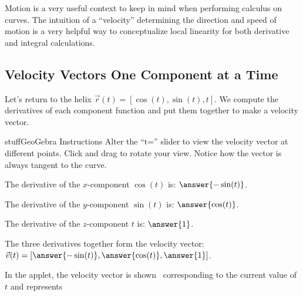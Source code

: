 \documentclass{ximera}
\begin{document}
Motion is a very useful context to keep in mind when performing calculus on curves. The intuition of a ``velocity'' determining the direction and speed of motion is a very helpful way to conceptualize local linearity for both derivative and integral calculations.

\subsection*{Velocity Vectors One Component at a Time}

Let's return to the helix $\vec{r}(t) = [ \cos(t), \sin(t), t ]$. We compute the derivatives of each component function and put them together to make a velocity vector.

\begin{problem}

\begin{expandable}{stuff}{GeoGebra Instructions}
    Alter the ``t='' slider to view the velocity vector at different points. Click and drag to rotate your view. Notice how the vector is always tangent to the curve.
\end{expandable}

\begin{center}
\end{center}

The derivative of the $x$-component $\cos(t)$ is: $\answer{-\sin(t)}$.

The derivative of the $y$-component $\sin(t)$ is: $\answer{\cos(t)}$.

The derivative of the $z$-component $t$ is: $\answer{1}$.

The three derivatives together form the velocity vector: $\vec{v}(t) = [\answer{-\sin(t)}, \answer{\cos(t)}, \answer{1}]$.

In the applet, the velocity vector is shown \  corresponding to the current value of $t$ and represents \begin{selectAll}
\end{selectAll}
\end{problem}
\end{document}
